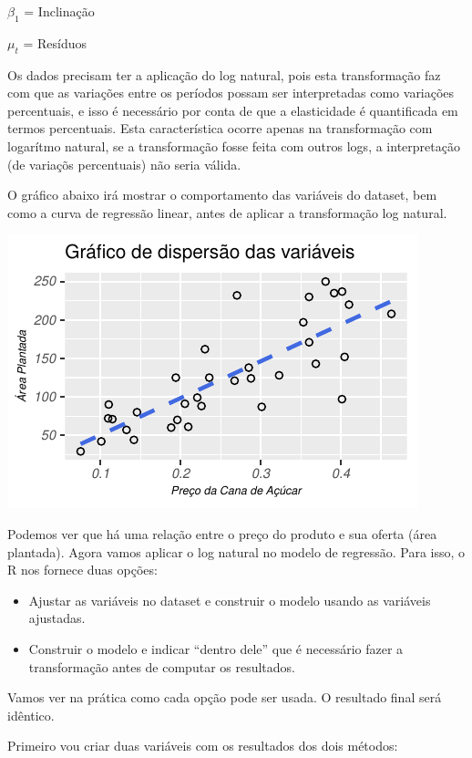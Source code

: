 \documentclass[
  12pt,
  a4paper,
]{article}
\begin{document}
\(\beta_1\) = Inclinação

\(\mu_t\) = Resíduos

Os dados precisam ter a aplicação do log natural, pois esta transformação faz com que as variações entre os períodos possam ser interpretadas como variações percentuais, e isso é necessário por conta de que a elasticidade é quantificada em termos percentuais. Esta característica ocorre apenas na transformação com logarítmo natural, se a transformação fosse feita com outros logs, a interpretação (de variaçõs percentuais) não seria válida.

O gráfico abaixo irá mostrar o comportamento das variáveis do dataset, bem como a curva de regressão linear, antes de aplicar a transformação log natural.

\begin{center}\includegraphics{article_files/figure-latex/unnamed-chunk-5-1} \end{center}

Podemos ver que há uma relação entre o preço do produto e sua oferta (área plantada). Agora vamos aplicar o log natural no modelo de regressão. Para isso, o R nos fornece duas opções:

\begin{itemize}
\item
  Ajustar as variáveis no dataset e construir o modelo usando as variáveis ajustadas.
\item
  Construir o modelo e indicar ``dentro dele'' que é necessário fazer a transformação antes de computar os resultados.
\end{itemize}

Vamos ver na prática como cada opção pode ser usada. O resultado final será idêntico.

Primeiro vou criar duas variáveis com os resultados dos dois métodos:
\end{document}
